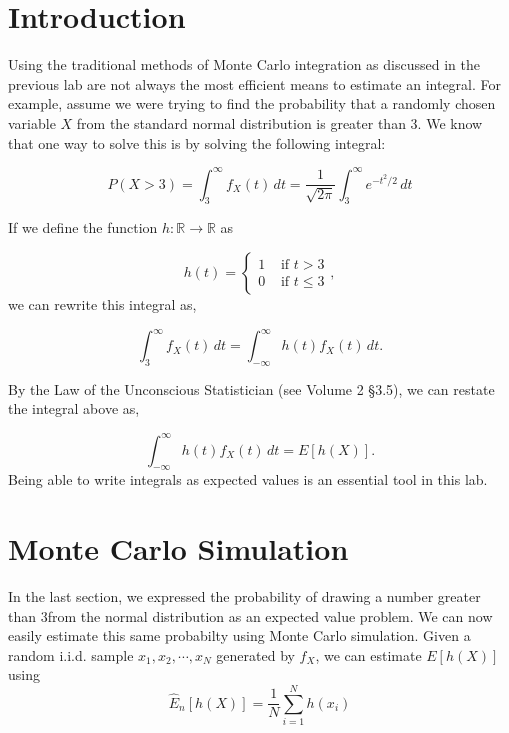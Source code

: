 \label{lab:montecarlo2}

\section*{Introduction}

Using the traditional methods of Monte Carlo integration as discussed in the previous lab are not always the most efficient means to estimate an integral. For example, assume we were trying to find the probability that a randomly chosen variable $X$ from the standard normal distribution is greater than $3$. We know that one way to solve this is by solving the following integral:

\begin{equation} \label{eq:integral} 
P(X > 3) = \int_{3}^{\infty} f_X(t)\,dt = \frac{1}{\sqrt{2\pi}}\int_{3}^{\infty} e^{-t^2/2}\,dt
\end{equation}

If we define the function $h: \mathbb{R} \rightarrow \mathbb{R}$ as 

$$h(t) = \begin{cases}
1 & \text{ if } t > 3 \\ 
0 & \text{ if } t \leq 3 
\end{cases}, $$
we can rewrite this integral as,

\begin{equation*}
\int_{3}^{\infty} f_X(t)\,dt = \int_{-\infty}^{\infty} h(t)f_X(t)\,dt.
\end{equation*}

By the Law of the Unconscious Statistician (see Volume 2 \S 3.5), we can restate the integral above as,

$$\int_{-\infty}^{\infty} h(t)f_X(t)\,dt = E[h(X)].$$
Being able to write integrals as expected values is an essential tool in this lab.

\section*{Monte Carlo Simulation}
In the last section, we expressed the probability of drawing a number greater than $3$from the normal distribution as an expected value problem. We can now easily estimate this same probabilty using Monte Carlo simulation. 
Given a random i.i.d. sample $x_1, x_2, \cdots , x_N$ generated by $f_X$, we can estimate $E[h(X)]$ using
\begin{equation} \label{eq:estimator}
\widehat{E}_n[h(X)] = \frac{1}{N}\sum_{i = 1}^{N}h(x_i)
\end{equation}

